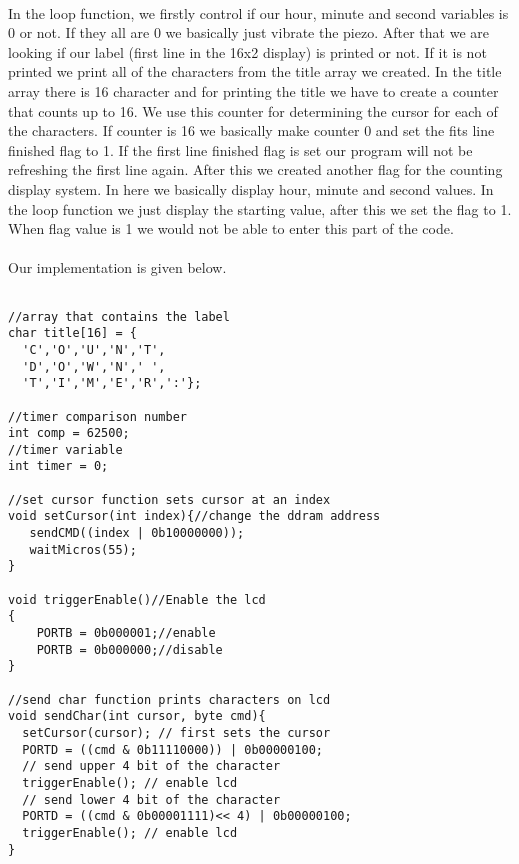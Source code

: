 \documentclass[pdftex,12pt,a4paper]{article}
\begin{document}
\begin{flushleft}
\paragraph{}
In the loop function, we firstly control if our hour, minute and second variables is 0 or not. If they all are 0 we basically just vibrate the piezo. After that we are looking if our label (first line in the 16x2 display) is printed or not. If it is not printed we print all of the characters from the title array we created. In the title array there is 16 character and for printing the title we have to create a counter that counts up to 16. We use this counter for determining the cursor for each of the characters. If counter is 16 we basically make counter 0 and set the fits line finished flag to 1. If the first line finished flag is set our program will not be refreshing the first line again. After this we created another flag for the counting display system. In here we basically display hour, minute and second values. In the loop function we just display the starting value, after this we set the flag to 1. When flag value is 1 we would not be able to enter this part of the code.

\newpage{}
\paragraph{}
Our implementation is given below.

\begin{lstlisting}[language=Arduino]

//array that contains the label
char title[16] = {
  'C','O','U','N','T',
  'D','O','W','N',' ',
  'T','I','M','E','R',':'};

//timer comparison number
int comp = 62500;
//timer variable
int timer = 0;

//set cursor function sets cursor at an index
void setCursor(int index){//change the ddram address
   sendCMD((index | 0b10000000));
   waitMicros(55);
}

void triggerEnable()//Enable the lcd
{
	PORTB = 0b000001;//enable
  	PORTB = 0b000000;//disable
}

//send char function prints characters on lcd
void sendChar(int cursor, byte cmd){
  setCursor(cursor); // first sets the cursor
  PORTD = ((cmd & 0b11110000)) | 0b00000100; 
  // send upper 4 bit of the character
  triggerEnable(); // enable lcd
  // send lower 4 bit of the character
  PORTD = ((cmd & 0b00001111)<< 4) | 0b00000100;
  triggerEnable(); // enable lcd
}


\end{lstlisting}
\end{flushleft}
\end{document}
